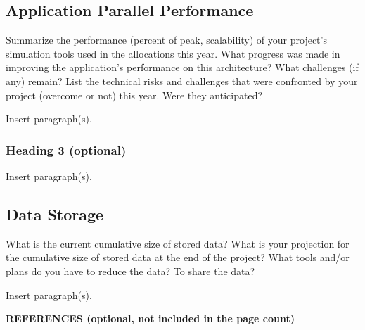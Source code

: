 \documentclass[11pt,letterpaper,english]{article}
\begin{document}
\subsection{Application Parallel Performance} 

Summarize the performance (percent of peak, scalability) of your project's simulation tools used in the allocations this year. What progress was made in improving the application's performance on this architecture? What challenges (if any) remain? List the technical risks and challenges that were confronted by your project (overcome or not) this year. Were they anticipated?

Insert paragraph(s).


\subsubsection{Heading 3 (optional)}

Insert paragraph(s).


\subsection{Data Storage} 

What is the current cumulative size of stored data? What is your projection for the cumulative size of stored data at the end of the project? What tools and/or plans do you have to reduce the data? To share the data?

Insert paragraph(s).


\vspace{.08in}
\textbf{REFERENCES (optional, not included in the page count)}
\vspace{6pt}

\end{document}
